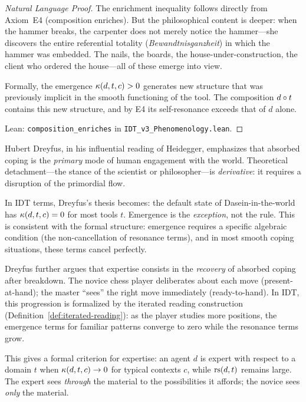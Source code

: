 \begin{proof}[Natural Language Proof]
The enrichment inequality follows directly from Axiom~E4 (composition enriches).
But the philosophical content is deeper: when the hammer breaks, the carpenter
does not merely notice the hammer---she discovers the entire referential totality
(\textit{Bewandtnisganzheit}) in which the hammer was embedded.  The nails, the
boards, the house-under-construction, the client who ordered the house---all of
these emerge into view.

Formally, the emergence $\kappa(d, t, c) > 0$ generates new structure that was
previously implicit in the smooth functioning of the tool.  The composition
$d \circ t$ contains this new structure, and by E4 its self-resonance exceeds
that of $d$ alone.

Lean: \texttt{composition\_enriches} in \texttt{IDT\_v3\_Phenomenology.lean}.
\end{proof}

\begin{interpretation}
\label{interp:dreyfus-coping}
Hubert Dreyfus, in his influential reading of Heidegger, emphasizes that
absorbed coping is the \emph{primary} mode of human engagement with the world.
Theoretical detachment---the stance of the scientist or philosopher---is
\emph{derivative}: it requires a disruption of the primordial flow.

In IDT terms, Dreyfus's thesis becomes: the default state of Dasein-in-the-world
has $\kappa(d, t, c) = 0$ for most tools $t$.  Emergence is the
\emph{exception}, not the rule.  This is consistent with the formal structure:
emergence requires a specific algebraic condition (the non-cancellation of
resonance terms), and in most smooth coping situations, these terms cancel
perfectly.

Dreyfus further argues that expertise consists in the \emph{recovery} of
absorbed coping after breakdown.  The novice chess player deliberates about
each move (present-at-hand); the master ``sees'' the right move immediately
(ready-to-hand).  In IDT, this progression is formalized by the iterated
reading construction (Definition~\ref{def:iterated-reading}): as the player
studies more positions, the emergence terms for familiar patterns converge
to zero while the resonance terms grow.

This gives a formal criterion for expertise: an agent $d$ is expert with
respect to a domain $t$ when $\kappa(d, t, c) \to 0$ for typical contexts $c$,
while $\mathrm{rs}(d, t)$ remains large.  The expert sees \emph{through} the material
to the possibilities it affords; the novice sees \emph{only} the material.
\end{interpretation}

